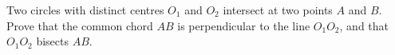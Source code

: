 Two circles with distinct centres $O_1$ and $O_2$ intersect at two points $A$ and $B$. Prove that the common chord $AB$ is perpendicular to the line $O_1O_2$, and that $O_1O_2$ bisects $AB$.

